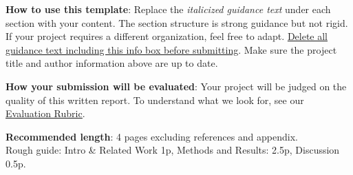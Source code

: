 \begin{infobox}
\textbf{How to use this template}: Replace the \textit{italicized guidance text} under each section with your content. The section structure is strong guidance but not rigid. If your project requires a different organization, feel free to adapt. \uline{Delete all guidance text including this info box before submitting}. Make sure the project title and author information above are up to date.

\textbf{How your submission will be evaluated}: Your project will be judged on the quality of this written report. To understand what we look for, see our \href{https://apartresearch.notion.site/sprint-evaluation-rubric}{\uline{Evaluation Rubric}}.

\textbf{Recommended length}: 4 pages excluding references and appendix.\\
Rough guide: Intro \& Related Work 1p, Methods and Results: 2.5p, Discussion 0.5p.
\end{infobox}
